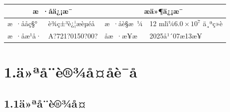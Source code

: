 \documentclass[UTF8,10pt,a4paper,fontset=fandol]{ctexart}
\newcommand{\fieldvalue}[1]{#1}
\newcommand{\handwritten}[1]{#1}
\begin{document}
\begin{center}
\begin{center}
\begin{tabularx}{\textwidth}{|l|X|l|X|}
\hline
\multicolumn{2}{|c|}{\textbf{æ ·åä¿¡æ¯}} & \multicolumn{2}{c|}{\textbf{æä»¶ä¿¡æ¯}}\\
\hline
æ ·ååç§° &
\fieldvalue{è¾ç±³è¿¦æèµéå} &
æ ·åè§æ ¼ &
\fieldvalue{12 mlï¼$6.0\times10^{7}$ ä¸ªç»è}\\
\hline
æ ·åæ¹å· &
\fieldvalue{\handwritten{A?721?0150?00?}} &
åæ ·æ¥æ &
\fieldvalue{\handwritten{2025å¹´07æ13æ¥}}\\
\hline
\end{tabularx}

\section{1.\quad ä»ªå¨è®¾å¤åè¯å}

\subsection{1.1\quad ä»ªå¨è®¾å¤}


\end{center}
\end{center}
\end{document}
